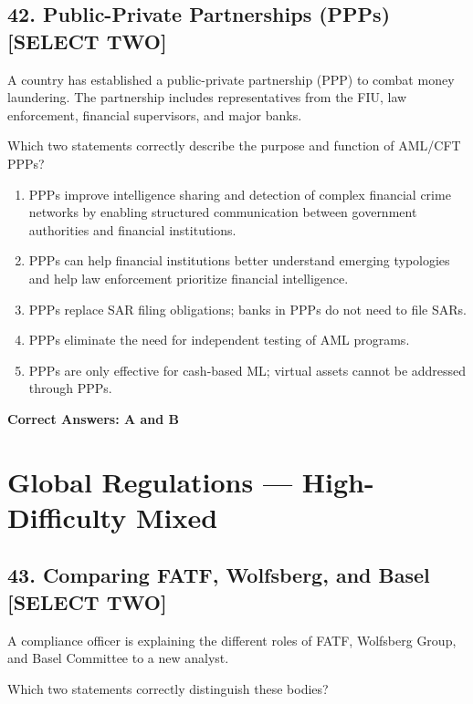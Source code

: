 \documentclass[11pt,a4paper]{article}
\begin{document}
	\subsection{42. Public-Private Partnerships (PPPs) \textnormal{[SELECT TWO]}}
	
	A country has established a public-private partnership (PPP) to combat money laundering. The partnership includes representatives from the FIU, law enforcement, financial supervisors, and major banks.
	
	Which two statements correctly describe the purpose and function of AML/CFT PPPs?
	
	\begin{enumerate}[label=\Alph*.]
		\item PPPs improve intelligence sharing and detection of complex financial crime networks by enabling structured communication between government authorities and financial institutions.
		\item PPPs can help financial institutions better understand emerging typologies and help law enforcement prioritize financial intelligence.
		\item PPPs replace SAR filing obligations; banks in PPPs do not need to file SARs.
		\item PPPs eliminate the need for independent testing of AML programs.
		\item PPPs are only effective for cash-based ML; virtual assets cannot be addressed through PPPs.
	\end{enumerate}
	
	\textbf{Correct Answers: A and B}
	
	\section{Global Regulations — High-Difficulty Mixed}
	
	\subsection{43. Comparing FATF, Wolfsberg, and Basel \textnormal{[SELECT TWO]}}
	
	A compliance officer is explaining the different roles of FATF, Wolfsberg Group, and Basel Committee to a new analyst.
	
	Which two statements correctly distinguish these bodies?
	
\end{document}
